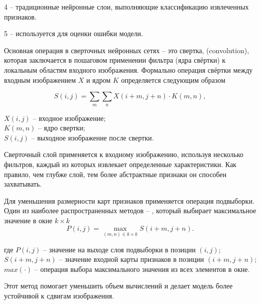     4  – традиционные нейронные слои, выполняющие 
классификацию извлеченных признаков.

    5  – используется для оценки ошибки модели.

\anonsection{}Основная операция в сверточных нейронных сетях – это свертка, 
(convolution), которая заключается в пошаговом применении фильтра (ядра 
свёртки) к локальным областям входного изображения. Формально операция свёртки 
между входным изображением $X$ и ядром $K$ определяется следующим образом

\begin{equation}
    S(i, j) = \sum_{m} \sum_{n} X(i+m, j+n) \cdot K(m, n),
\end{equation}

  \( X(i, j) \) – входное изображение;\\
\hphantom{где } \( K(m, n) \) – ядро свертки;\\
\hphantom{где } \( S(i, j) \) – выходное изображение после свертки.

Сверточный слой применяется к входному изображению, используя несколько 
фильтров, каждый из которых извлекает определенные характеристики. Как правило,
чем глубже слой, тем более абстрактные признаки он способен захватывать.

\anonsection{}Для уменьшения размерности карт признаков применяется операция 
подвыборки. Один из наиболее распространенных методов – , 
который выбирает максимальное значение в окне \( k \times k \)
\begin{equation}
    P(i, j) = \max_{(m, n) \in k \times k} S(i+m, j+n).
\end{equation}

\noindent где \(P(i, j)\) – значение на выходе слоя подвыборки в позиции \((i, j)\);\\
\hphantom{где }\(S(i + m, j + n)\) – значение входной карты признаков в позиции \((i + m, j + n)\);\\
\hphantom{где }\(max(\cdot)\) – операция выбора максимального значения из всех элементов в окне.


Этот метод помогает уменьшить объем вычислений и делает модель более устойчивой
к сдвигам изображения.

